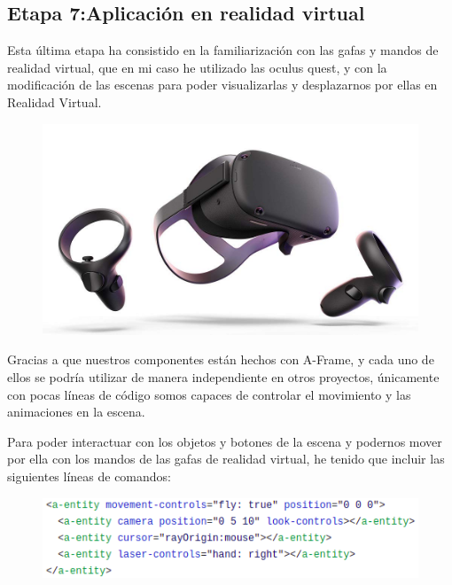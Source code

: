 \documentclass[a4paper, 12pt]{book}
\begin{document}
\newpage
\subsection{Etapa 7:Aplicación en realidad virtual}
Esta última etapa ha consistido en la familiarización con las gafas y mandos de realidad virtual, que en mi caso he utilizado las oculus quest, y con la modificación de las escenas para poder visualizarlas y desplazarnos por ellas en Realidad Virtual.

\begin{figure}[h]
\centering
    \includegraphics[scale=0.28]{img/gafas_oculus.jpg}
\end{figure}

Gracias a que nuestros componentes están hechos con A-Frame, y cada uno de ellos se podría utilizar de manera independiente en otros proyectos, únicamente con pocas líneas de código somos capaces de controlar el movimiento y las animaciones en la escena.

Para poder interactuar con los objetos y botones de la escena y podernos mover por ella con los mandos de las gafas de realidad virtual, he tenido que incluir las siguientes líneas de comandos:

\begin{figure}[h]
\centering
    \includegraphics[scale=0.7]{img/codigoVR.png}
\end{figure}
\end{document}
